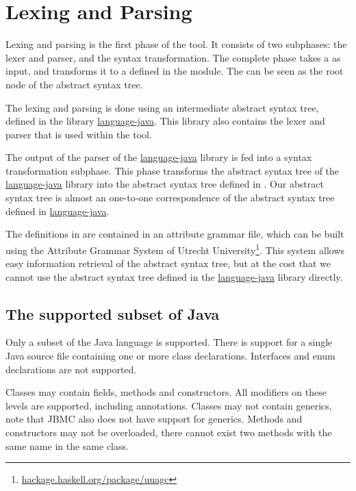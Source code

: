 \section{Lexing and Parsing}
Lexing and parsing is the first phase of the tool. It consists of two subphases:
the lexer and parser, and the syntax transformation. The complete phase takes a 
 as input, and transforms it to a 
defined in the  module. The 
 can be seen as the root node of the abstract
syntax tree.

The lexing and parsing is done using an intermediate abstract syntax tree, defined
in the library \href{http://hackage.haskell.org/package/language-java}{language-java}.
This library also contains the lexer and parser that is used within the tool.

The output of the parser of the 
\href{http://hackage.haskell.org/package/language-java}{language-java} library 
is fed into a syntax transformation subphase. This phase transforms the abstract 
syntax tree of the \href{http://hackage.haskell.org/package/language-java}{language-java} 
library into the abstract syntax tree defined in .
Our abstract syntax tree is almost an one-to-one correspondence of the abstract
syntax tree defined in \href{http://hackage.haskell.org/package/language-java}{language-java}.

The definitions in  are contained in an attribute 
grammar file, which can be built using the Attribute Grammar System of Utrecht
University\footnote{\url{hackage.haskell.org/package/uuagc}}. This system allows
easy information retrieval of the abstract syntax tree, but at the cost that we
cannot use the abstract syntax tree defined in the 
\href{http://hackage.haskell.org/package/language-java}{language-java} library 
directly.

\subsection{The supported subset of Java}
Only a subset of the Java language is supported. There is support for a single
Java source file containing one or more class declarations. Interfaces and enum 
declarations are not supported. 

Classes may contain fields, methods and constructors. All modifiers on these 
levels are supported, including annotations. Classes may not contain generics, 
note that JBMC also does not have support for generics. Methods and constructors
may not be overloaded, there cannot exist two methods with the same name in the
same class.

